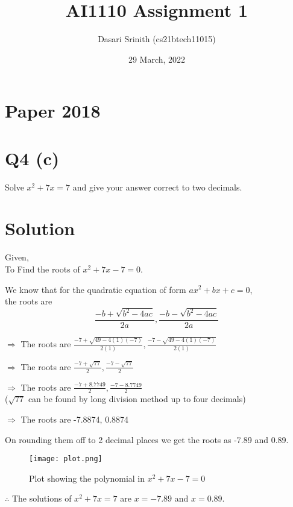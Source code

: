 \documentclass[12pt]{article}
\title{AI1110 Assignment 1}
\author{Dasari Srinith (cs21btech11015)}
\date{29 March, 2022}
\begin{document}
\maketitle
\section*{Paper 2018}

\section*{Q4 (c)}

    Solve $x^2 + 7x = 7$ and give your answer correct to two decimals.
    
\section*{Solution}

    Given,\\
    To Find the roots of $x^2 +7x -7 = 0$.
    
    We know that for the quadratic equation of form $ax^2 + bx +c = 0$,\\
    the roots are
               $$\displaystyle\frac{-b+\sqrt{b^2 -4ac}}{2a}
                       ,\displaystyle\frac{-b-\sqrt{b^2 -4ac}}{2a}$$
                       
    $\Rightarrow$ The roots are $\displaystyle\frac{-7+\sqrt{49 -4(1)(-7)}}{2(1)}
                       ,\displaystyle\frac{-7-\sqrt{49 -4(1)(-7)}}{2(1)}$
                       
    $\Rightarrow$ The roots are $\displaystyle\frac{-7+\sqrt{77}}{2}
                       ,\displaystyle\frac{-7-\sqrt{77}}{2}$
                       
    $\Rightarrow$ The roots are $\displaystyle\frac{-7+8.7749}{2}
                       ,\displaystyle\frac{-7-8.7749}{2}$\\
    ($\sqrt{77}$ can be found by long division method up to four decimals)
                       
    $\Rightarrow$ The roots are -7.8874, 0.8874
    
    On rounding them off to 2 decimal places we get the roots as -7.89 and 0.89.
    
    \begin{figure}
        \texttt{[image: plot.png]}
        \caption{Plot showing the polynomial in $x^2 +7x -7 = 0$}
    \end{figure}
    
    $\therefore$ The solutions of $x^2 + 7x = 7$ are  $x = -7.89$ and $x = 0.89$.
    
\end{document}
